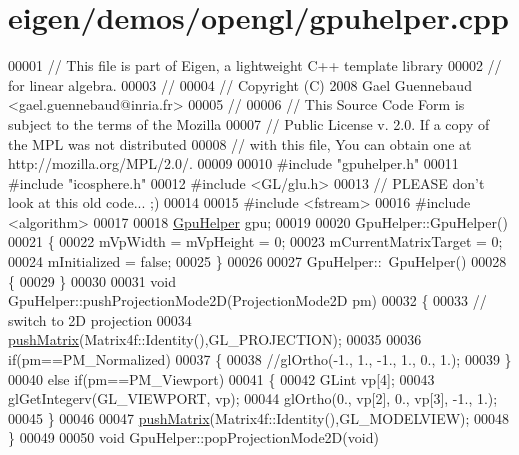 \hypertarget{eigen_2demos_2opengl_2gpuhelper_8cpp_source}{}\section{eigen/demos/opengl/gpuhelper.cpp}
\label{eigen_2demos_2opengl_2gpuhelper_8cpp_source}

\begin{DoxyCode}
00001 \textcolor{comment}{// This file is part of Eigen, a lightweight C++ template library}
00002 \textcolor{comment}{// for linear algebra.}
00003 \textcolor{comment}{//}
00004 \textcolor{comment}{// Copyright (C) 2008 Gael Guennebaud <gael.guennebaud@inria.fr>}
00005 \textcolor{comment}{//}
00006 \textcolor{comment}{// This Source Code Form is subject to the terms of the Mozilla}
00007 \textcolor{comment}{// Public License v. 2.0. If a copy of the MPL was not distributed}
00008 \textcolor{comment}{// with this file, You can obtain one at http://mozilla.org/MPL/2.0/.}
00009 
00010 \textcolor{preprocessor}{#include "gpuhelper.h"}
00011 \textcolor{preprocessor}{#include "icosphere.h"}
00012 \textcolor{preprocessor}{#include <GL/glu.h>}
00013 \textcolor{comment}{// PLEASE don't look at this old code... ;)}
00014 
00015 \textcolor{preprocessor}{#include <fstream>}
00016 \textcolor{preprocessor}{#include <algorithm>}
00017 
00018 \hyperlink{class_gpu_helper}{GpuHelper} gpu;
00019 
00020 GpuHelper::GpuHelper()
00021 \{
00022     mVpWidth = mVpHeight = 0;
00023     mCurrentMatrixTarget = 0;
00024     mInitialized = \textcolor{keyword}{false};
00025 \}
00026 
00027 GpuHelper::~GpuHelper()
00028 \{
00029 \}
00030 
00031 \textcolor{keywordtype}{void} GpuHelper::pushProjectionMode2D(ProjectionMode2D pm)
00032 \{
00033     \textcolor{comment}{// switch to 2D projection}
00034     \hyperlink{class_gpu_helper_ac51c8b669a80ca6e4338c87136fb991e}{pushMatrix}(Matrix4f::Identity(),GL\_PROJECTION);
00035 
00036     \textcolor{keywordflow}{if}(pm==PM\_Normalized)
00037     \{
00038         \textcolor{comment}{//glOrtho(-1., 1., -1., 1., 0., 1.);}
00039     \}
00040     \textcolor{keywordflow}{else} \textcolor{keywordflow}{if}(pm==PM\_Viewport)
00041     \{
00042         GLint vp[4];
00043         glGetIntegerv(GL\_VIEWPORT, vp);
00044         glOrtho(0., vp[2], 0., vp[3], -1., 1.);
00045     \}
00046 
00047     \hyperlink{class_gpu_helper_ac51c8b669a80ca6e4338c87136fb991e}{pushMatrix}(Matrix4f::Identity(),GL\_MODELVIEW);
00048 \}
00049 
00050 \textcolor{keywordtype}{void} GpuHelper::popProjectionMode2D(\textcolor{keywordtype}{void})

\end{DoxyCode}

